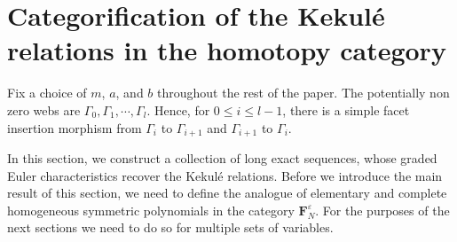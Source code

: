 \documentclass[12pt]{amsart}
\theoremstyle{definition}
\theoremstyle{remark}
\numberwithin{equation}{section}
\numberwithin{figure}{section}
\newcommand{\Foam}{\mathbf{F}_N}
\begin{document}
\section{Categorification of the Kekulé relations in the homotopy category}\label{sec:hocat categorificaiton}

Fix a choice of  $m$, $a$, and $b$ throughout the rest of the paper. The potentially non zero webs are $\Gamma_0,\Gamma_1,\cdots,\Gamma_l$. Hence, for $0\leq i\leq l-1$, there is a simple facet insertion morphism from $\Gamma_i$ to $\Gamma_{i+1}$ and $\Gamma_{i+1}$ to $\Gamma_i$. 

In this section, we construct a collection of long exact sequences, whose graded Euler characteristics recover the Kekulé relations. Before we introduce the main result of this section, we need to define the analogue of elementary and complete homogeneous symmetric polynomials in the category $\Foam^\varepsilon$. For the purposes of the next sections we need to do so for multiple sets of variables.
\end{document}
